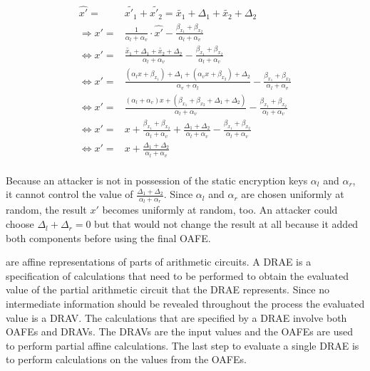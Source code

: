 \begin{align*}
  \widehat{x'} = & \widetilde{x'_1} + \widetilde{x'_2} = \widetilde{x_1} +
  \Delta_1 + \widetilde{x_2} + \Delta_2 \\
  \Rightarrow x' = & \frac{1}{\alpha_l + \alpha_v} \cdot \widehat{x'} -
  \frac{\beta_{x_1} +
  \beta_{x_2}}{\alpha_l + \alpha_v} \\
  \Leftrightarrow x' = & \frac{\widetilde{x_1} + \Delta_1 +
  \widetilde{x_2} + \Delta_2}{\alpha_l + \alpha_v} -
  \frac{\beta_{x_1} +\beta_{x_2}}{\alpha_l + \alpha_v}\\
  \Leftrightarrow x' = & \frac{(\alpha_l x + \beta_{x_1}) + \Delta_1 +
  (\alpha_v x + \beta_{x_2}) + \Delta_2}{\alpha_v + \alpha_l} -
  \frac{\beta_{x_1} +\beta_{x_2}}{\alpha_l + \alpha_v} \\
  \Leftrightarrow x' = & \frac{(\alpha_l+\alpha_v)x + (\beta_{x_1}+\beta_{x_2} +
  \Delta_1+\Delta_2)}{\alpha_l+\alpha_v} -
  \frac{\beta_{x_1} +\beta_{x_2}}{\alpha_l + \alpha_v} \\
  \Leftrightarrow x' = & x + \frac{\beta_{x_1}+\beta_{x_2}}{\alpha_l+\alpha_v}
  + \frac{\Delta_1 + \Delta_2}{\alpha_l + \alpha_v} -
  \frac{\beta_{x_1}+\beta_{x_2}}{\alpha_l + \alpha_v} \\
  \Leftrightarrow x' = & x + \frac{\Delta_1 + \Delta_2}{\alpha_l + \alpha_v}\\
\end{align*}

Because an attacker is not in possession of the static encryption keys
$\alpha_l$ and $\alpha_r$, it cannot control the value of $\frac{\Delta_1 +
\Delta_2}{\alpha_l + \alpha_r}$. Since $\alpha_l$ and $\alpha_r$ are chosen
uniformly at random, the result $x'$ becomes uniformly at random, too. An
attacker could choose $\Delta_l + \Delta_r = 0$ but that would not change the
result at all because it added both components before using the final OAFE.


%
%
\label{sec:drae}

 are affine representations of
parts of arithmetic circuits. A DRAE is a specification of calculations that
need to be performed to obtain the evaluated value of the partial arithmetic
circuit that the DRAE represents. Since no intermediate information should be
revealed throughout the process the evaluated value is a DRAV. The calculations
that are specified by a DRAE involve both OAFEs and DRAVs. The DRAVs are the
input values and the OAFEs are used to perform partial affine calculations. The
last step to evaluate a single DRAE is to perform calculations on the values
from the OAFEs.

